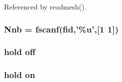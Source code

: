 Referenced by readmesh().

\subsubsection[{Nnb}]{\setlength{\rightskip}{0pt plus 5cm}Nnb = {\bf fscanf}({\bf fid},'\%u',[1 1])}\label{plotting_8m_a5fb7d1cc735c0ff852c27ba483deddf4}
\subsubsection[{off}]{\setlength{\rightskip}{0pt plus 5cm}hold off}\label{plotting_8m_a835accca41274fb237599d9b3c117fcf}
\subsubsection[{on}]{\setlength{\rightskip}{0pt plus 5cm}hold on}\label{plotting_8m_a58ab1fd68e97078232808206b850161b}
